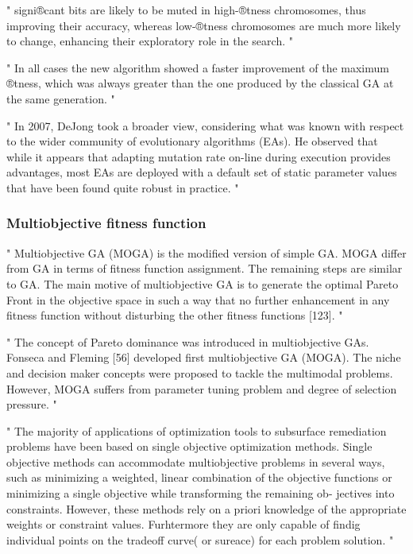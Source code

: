 "
signi®cant bits are likely to be muted in high-®tness chromosomes, thus improving their accuracy, whereas low-®tness chromosomes are much more likely to change, enhancing their exploratory role in the search.
"\cite{marsili_libelli_adaptive_2000}

"
In all cases the new algorithm showed a faster improvement of the maximum ®tness, which was always greater than the one produced by the classical GA at the same generation.
"\cite{marsili_libelli_adaptive_2000}


"
In 2007, DeJong took a broader view, considering what was known with respect to the wider community of evolutionary algorithms (EAs). He observed that while it appears that adapting mutation rate on-line during execution provides advantages, most EAs are deployed with a default set of static parameter values that have been found quite robust in practice.
"\cite{mills_determining_2015}



\iffalse
\subsubsection{Multiobjective fitness function}

"
Multiobjective GA (MOGA) is the modified version of simple GA. MOGA differ from GA in terms of fitness function assignment. The remaining steps are similar to GA. The main motive of multiobjective GA is to generate the optimal Pareto Front in the objective space in such a way that no further enhancement in any fitness function without disturbing the other fitness functions [123].
"\cite{katoch_review_2021}


"
The concept of Pareto dominance was introduced in multiobjective GAs. Fonseca and Fleming [56] developed first multiobjective GA (MOGA). The niche and decision maker concepts were proposed to tackle the multimodal problems. However, MOGA suffers from parameter tuning problem and degree of selection pressure.
"\cite{katoch_review_2021}

"
The majority of applications of optimization tools to subsurface remediation problems have been based on single objective optimization methods. Single objective methods can accommodate multiobjective problems in several ways, such as minimizing a weighted, linear combination of the objective functions or minimizing a single objective while transforming the remaining ob- jectives into constraints. However, these methods rely on a priori knowledge of the appropriate weights or constraint values. Furhtermore they are only capable of findig individual points on the tradeoff curve( or sureace) for each problem solution.
"\cite{erickson_multi-objective_2002}

